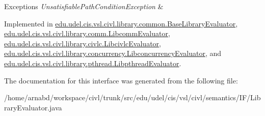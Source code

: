 \begin{DoxyExceptions}{Exceptions}
{\em Unsatisfiable\+Path\+Condition\+Exception} & \\
\hline
\end{DoxyExceptions}


Implemented in \hyperlink{classedu_1_1udel_1_1cis_1_1vsl_1_1civl_1_1library_1_1common_1_1BaseLibraryEvaluator_a913ede010e3db701ee3d440287317ce0}{edu.\+udel.\+cis.\+vsl.\+civl.\+library.\+common.\+Base\+Library\+Evaluator}, \hyperlink{classedu_1_1udel_1_1cis_1_1vsl_1_1civl_1_1library_1_1comm_1_1LibcommEvaluator_aad21a311a582cb5e0712a3d13c885962}{edu.\+udel.\+cis.\+vsl.\+civl.\+library.\+comm.\+Libcomm\+Evaluator}, \hyperlink{classedu_1_1udel_1_1cis_1_1vsl_1_1civl_1_1library_1_1civlc_1_1LibcivlcEvaluator_aecb1e385c762c4c6a3631d91fcb72a4e}{edu.\+udel.\+cis.\+vsl.\+civl.\+library.\+civlc.\+Libcivlc\+Evaluator}, \hyperlink{classedu_1_1udel_1_1cis_1_1vsl_1_1civl_1_1library_1_1concurrency_1_1LibconcurrencyEvaluator_a791ac6b538242b01bb9d3d22b882c533}{edu.\+udel.\+cis.\+vsl.\+civl.\+library.\+concurrency.\+Libconcurrency\+Evaluator}, and \hyperlink{classedu_1_1udel_1_1cis_1_1vsl_1_1civl_1_1library_1_1pthread_1_1LibpthreadEvaluator_a80ed2c2e21bb7585242a138fe83614e4}{edu.\+udel.\+cis.\+vsl.\+civl.\+library.\+pthread.\+Libpthread\+Evaluator}.



The documentation for this interface was generated from the following file\+:\begin{DoxyCompactItemize}
\item 
/home/arnabd/workspace/civl/trunk/src/edu/udel/cis/vsl/civl/semantics/\+I\+F/Library\+Evaluator.\+java\end{DoxyCompactItemize}
